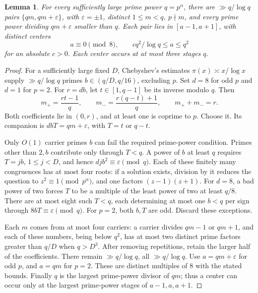 \documentclass[11pt]{article}
\newtheorem{lemma}{Lemma}
\begin{document}
\begin{lemma}\label{pairs}
For every sufficiently large prime power \(q=p^\alpha\), there are
\(\gg q/\log q\) pairs \(\{qm,qm+\varepsilon\}\), with
\(\varepsilon=\pm1\), distinct \(1\le m<q\), \(p\nmid m\), and every
prime power dividing \(qm+\varepsilon\) smaller than \(q\).
Each pair lies in \([a-1,a+1]\), with distinct centers
\[
              a\equiv0\pmod8,\qquad cq^2/\log q\le a\le q^2
\]
for an absolute \(c>0\). Each center occurs at at most three stages \(q\).
\end{lemma}

\begin{proof}
For a sufficiently large fixed \(D\), Chebyshev's estimates
\(\pi(x)\asymp x/\log x\) \cite{HW} supply \(\gg q/\log q\) primes
\(b\in(q/D,q/16)\), excluding \(p\). Set \(d=8\) for odd \(p\)
and \(d=1\) for \(p=2\).
For \(r=db\), let \(t\in[1,q-1]\) be its inverse modulo \(q\).
Then
\[
 m_+=\frac{rt-1}{q},\qquad
 m_-=\frac{r(q-t)+1}{q},\qquad m_++m_-=r.
\]
Both coefficients lie in \((0,r)\), and at least one is coprime to
\(p\). Choose it. Its companion is \(dbT=qm+\varepsilon\), with
\(T=t\) or \(q-t\).

Only \(O(1)\) carrier primes \(b\) can fail the required
prime-power condition. Primes other than \(2,b\) contribute only
through \(T<q\). A power of \(b\) at least \(q\) requires
\(T=jb\), \(1\le j<D\), and hence
\(djb^2\equiv\varepsilon\pmod q\).
Each of these finitely many congruences has at most four roots:
if a solution exists, division by it reduces the question to
\(z^2\equiv1\pmod{p^\alpha}\), and one factors \((z-1)(z+1)\).
For \(d=8\), a bad power of two forces \(T\) to be a multiple
of the least power of two at least \(q/8\). There are at most
eight such \(T<q\), each determining at most one \(b<q\) per
sign through \(8bT\equiv\varepsilon\pmod q\).
For \(p=2\), both \(b,T\) are odd. Discard these exceptions.

Each \(m\) comes from at most four carriers: a carrier divides
\(qm-1\) or \(qm+1\), and each of these numbers, being below \(q^2\),
has at most two distinct prime factors greater than \(q/D\)
when \(q>D^3\).
After removing repetitions, retain the larger half of the
coefficients. There remain \(\gg q/\log q\), all
\(\gg q/\log q\).
Use \(a=qm+\varepsilon\) for odd \(p\), and \(a=qm\) for \(p=2\).
These are distinct multiples of \(8\) with the stated bounds.
Finally \(q\) is the largest prime-power divisor of \(qm\);
thus a center can occur only at the largest prime-power stages
of \(a-1,a,a+1\).
\end{proof}
\end{document}
